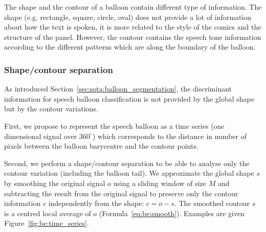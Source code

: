 The shape and the contour of a balloon contain different type of information.
The shape (e.g. rectangle, square, circle, oval) does not provide a lot of information about how the text is spoken, it is more related to the style of the comics and the structure of the panel.
However, the contour contains the speech tone information according to the different patterns which are along the boundary of the balloon.




\subsubsection{Shape/contour separation}
\label{sec:contour_detection}
As introduced Section~\ref{sec:sota:balloon_segmentation}, the discriminant information for speech balloon classification is not provided by the global shape but by the contour variations. 

First, we propose to represent the speech balloon as a time series (one dimensional signal over $360^\circ$) which corresponds to the distance in number of pixels between the balloon barycentre and the contour points. 

Second, we perform a shape/contour separation to be able to analyse only the contour variation (including the balloon tail). We approximate the global shape $s$ by smoothing the original signal $o$ using a sliding window of size $M$ and subtracting the result from the original signal to preserve only the contour information $c$ independently from the shape: $c = o - s$. The smoothed contour $s$ is a centred local average of $o$ (Formula~\ref{eq:be:smooth}).
Examples are given Figure~\ref{fig:be:time_series}.


